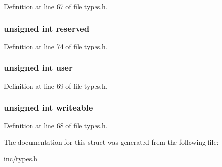 Definition at line 67 of file types.h.

\hypertarget{structpage_a05d5cbcb44f437341bd9fa37d589aced}{
\subsubsection[{reserved}]{\setlength{\rightskip}{0pt plus 5cm}unsigned int {\bf reserved}}}
\label{structpage_a05d5cbcb44f437341bd9fa37d589aced}


Definition at line 74 of file types.h.

\hypertarget{structpage_aaf4a05f547280bd4819e5df8c4523cd1}{
\subsubsection[{user}]{\setlength{\rightskip}{0pt plus 5cm}unsigned int {\bf user}}}
\label{structpage_aaf4a05f547280bd4819e5df8c4523cd1}


Definition at line 69 of file types.h.

\hypertarget{structpage_a053ea5deda2f64604e4541bf626bef9c}{
\subsubsection[{writeable}]{\setlength{\rightskip}{0pt plus 5cm}unsigned int {\bf writeable}}}
\label{structpage_a053ea5deda2f64604e4541bf626bef9c}


Definition at line 68 of file types.h.



The documentation for this struct was generated from the following file:\begin{DoxyCompactItemize}
\item 
inc/\hyperlink{types_8h}{types.h}\end{DoxyCompactItemize}
